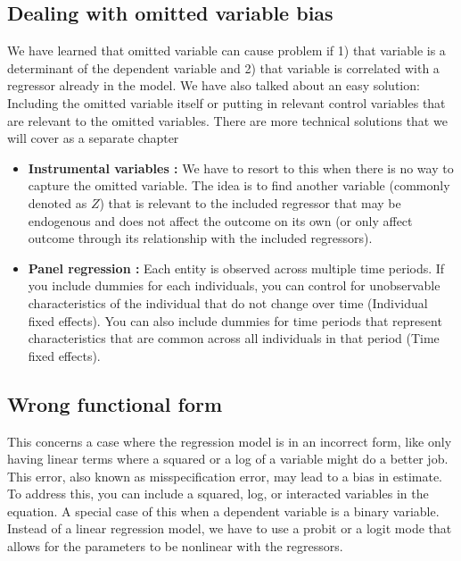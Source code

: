 \documentclass[12pt]{article}
\theoremstyle{definition}
\theoremstyle{property}
\theoremstyle{assumption}
\theoremstyle{example}
\theoremstyle{comment}
\begin{document}
\subsection{Dealing with omitted variable bias}
We have learned that omitted variable can cause problem if 1) that variable is a determinant of the dependent variable and 2) that variable is correlated with a regressor already in the model. We have also talked about an easy solution: Including the omitted variable itself or putting in relevant control variables that are relevant to the omitted variables. There are more technical solutions that we will cover as a separate chapter
\begin{itemize}
\item \textbf{Instrumental variables :} We have to resort to this when there is no way to capture the omitted variable. The idea is to find another variable (commonly denoted as $Z$) that is relevant to the included regressor that may be endogenous and does not affect the outcome on its own (or only affect outcome through its relationship with the included regressors). 
\item \textbf{Panel regression :} Each entity is observed across multiple time periods. If you include dummies for each individuals, you can control for unobservable characteristics of the individual that do not change over time (Individual fixed effects). You can also include dummies for time periods that represent characteristics that are common across all individuals in that period (Time fixed effects). 
\end{itemize}

\subsection{Wrong functional form}
This concerns a case where the regression model is in an incorrect form, like only having linear terms where a squared or a log of a variable might do a better job. This error, also known as misspecification error, may lead to a bias in estimate. To address this, you can include a squared, log, or interacted variables in the equation. A special case of this when a dependent variable is a binary variable. Instead of a linear regression model, we have to use a probit or a logit mode that allows for the parameters to be nonlinear with the regressors. 
\end{document}
